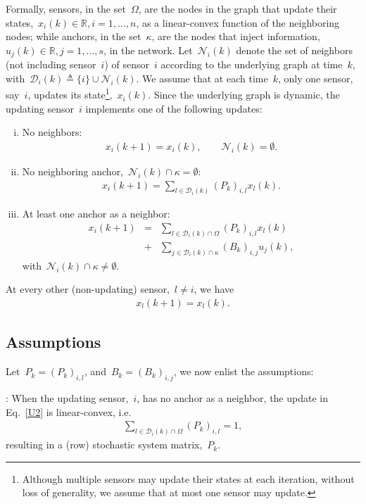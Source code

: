 \documentclass[draftclsnofoot, onecolumn, 12pt]{IEEEtran}
\def\mc{\mathcal}
\def\mbb{\mathbb}
\begin{document}
Formally, sensors, in the set~$\Omega$, are the nodes in the graph that update their states,~$x_i(k)\in\mbb{R}, i=1,\ldots,n$, as a linear-convex function of the neighboring nodes; while anchors, in the set~$\kappa$, are the nodes that inject information,~$u_j(k)\in\mbb{R},j=1,\ldots,s$, in the network. Let~$\mc{N}_i(k)$ denote the set of neighbors (not including sensor~$i$) of sensor~$i$ according to the underlying graph at time~$k$, with~$\mc{D}_i(k)\triangleq\{i\}\cup\mc{N}_i(k)$. We assume that at each time~$k$, only one sensor, say~$i$, updates its state\footnote{Although multiple sensors may update their states at each iteration, without loss of generality, we assume that at most one sensor may update.},~$x_i(k)$. Since the underlying graph is dynamic, the updating sensor~$i$ implements one of the following updates:
\begin{enumerate}[(i)]
\item No neighbors:
\begin{eqnarray}\label{U1}
x_i(k+1) = x_i(k),\qquad\mc{N}_i(k)=\emptyset.
\end{eqnarray}
\item No neighboring anchor,~$\mc{N}_i(k)\cap\kappa=\emptyset$:
\begin{eqnarray}\label{U2}
x_i(k+1) = \sum\limits_{l\in{\mc{D}_{i}(k)}}({P}_{k})_{i,l}{x}_{l}(k). 
\end{eqnarray}
\item At least one anchor as a neighbor:
\begin{eqnarray}\nonumber
x_i(k+1) &=& 
\sum\limits_{l\in{\mc{D}_{i}(k)\cap\Omega}}({P}_{k})_{i,l}{x}_{l}(k)\\ \label{U3}
&+& \sum\limits_{j\in{\mc{D}_i(k)}\cap\kappa}({B}_{k})_{i,j}{u}_{j}(k),
\end{eqnarray}
with~$\mc{N}_i(k)\cap\kappa\neq\emptyset$.
\end{enumerate}
At every other (non-updating) sensor,~$l\neq i$, we have
\begin{eqnarray}\label{U4}
x_l(k+1) = x_l(k).
\end{eqnarray}


\subsection{Assumptions} 
Let~${P}_k=({P}_{k})_{i,l}$, and~${B}_k=({B}_{k})_{i,j}$, we now enlist the assumptions:

: When the updating sensor,~$i$, has no anchor as a neighbor, the update in Eq.~\eqref{U2} is linear-convex, i.e.
\begin{eqnarray}
\sum\limits_{l\in{\mc{D}_{i}(k)}\cap\Omega}({P}_{k})_{i,l} = 1,
\end{eqnarray}
resulting in a (row) stochastic system matrix,~${P}_k$.
\end{document}
